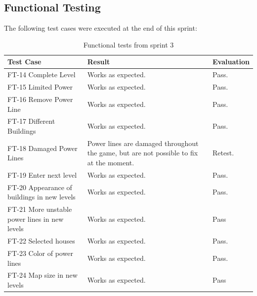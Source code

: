 \subsection{Functional Testing}

	The following test cases were executed at the end of this sprint:


	\begin{table}[H]
	\begin{tabular}{| p{3cm} | p{6.5cm} | p{2.5cm} |}
		\hline
		\rowcolor{lightgray}
		{\bf Test Case} & {\bf Result} & {\bf Evaluation} \\ \hline

	  	FT-14 Complete Level & Works as expected. & Pass. \\ \hline
	  	
	  	FT-15 Limited Power & Works as expected. & Pass. \\ \hline
	  	
	  	FT-16 Remove Power Line & Works as expected. & Pass. \\ \hline
	  		  	
	  	FT-17 Different Buildings & Works as expected. & Pass. \\ \hline

	  	FT-18 Damaged Power Lines & Power lines are damaged throughout the game, but are not possible 
	  	to fix at the moment. & Retest. \\ \hline
	  	
	  	FT-19 Enter next level & Works as expected. & Pass. \\ \hline

	  	FT-20 Appearance of buildings in new levels & Works as expected. & Pass. \\ \hline

	  	FT-21 More unstable power lines in new levels & Works as expected. & Pass \\ \hline

	  	FT-22 Selected houses & Works as expected. & Pass. \\ \hline

	  	FT-23 Color of power lines & Works as expected. & Pass. \\ \hline
	  	FT-24 Map size in new levels & Works as expected. & Pass \\ \hline

	\end{tabular}
	\caption{Functional tests from sprint 3}
	\end{table}

